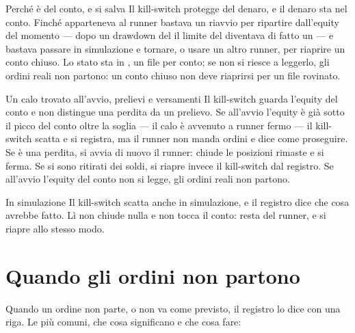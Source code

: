 \begin{perche}{Perché è del conto, e si salva}
Il kill-switch protegge del denaro, e il denaro sta nel conto. Finché
apparteneva al runner bastava un riavvio per ripartire dall'equity del
momento --- dopo un drawdown del  il limite del  diventava
di fatto un  --- e bastava passare in simulazione e tornare, o
usare un altro runner, per riaprire un conto chiuso. Lo stato sta in
, un file per conto; se non si riesce a leggerlo, gli
ordini reali non partono: un conto chiuso non deve riaprirsi per un file
rovinato.
\end{perche}

\begin{nota}{Un calo trovato all'avvio, prelievi e versamenti}
Il kill-switch guarda l'equity del conto e non distingue una perdita da un
prelievo. Se all'avvio l'equity è già sotto il picco del conto oltre la
soglia --- il calo è avvenuto a runner fermo --- il kill-switch scatta e si
registra, ma il runner non manda ordini e dice come proseguire. Se è una
perdita, si avvia di nuovo il runner: chiude le posizioni rimaste e si
ferma. Se si sono ritirati dei soldi, si riapre invece il kill-switch dal
registro. Se all'avvio l'equity del conto non si legge, gli ordini reali
non partono.
\end{nota}

\begin{nota}{In simulazione}
Il kill-switch scatta anche in simulazione, e il registro dice che cosa
avrebbe fatto. Lì non chiude nulla e non tocca il conto: resta del runner,
e si riapre allo stesso modo.
\end{nota}

\section{Quando gli ordini non partono}\label{sez:ordini-fermi}

Quando un ordine non parte, o non va come previsto, il registro lo dice con
una riga. Le più comuni, che cosa significano e che cosa fare:

